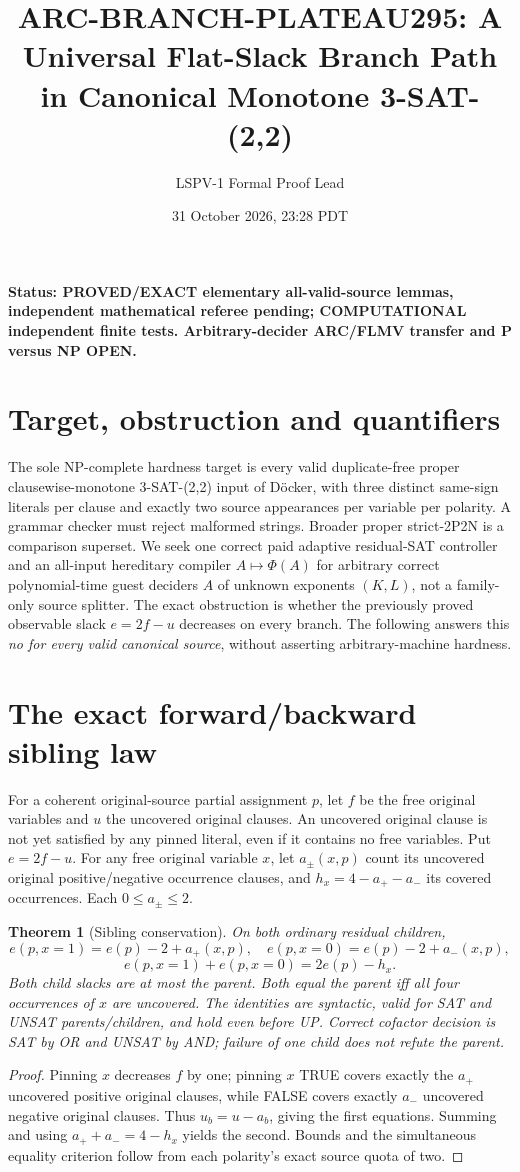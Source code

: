 \documentclass[11pt]{article}
\title{ARC-BRANCH-PLATEAU295: A Universal Flat-Slack Branch Path in Canonical Monotone 3-SAT-(2,2)}
\author{LSPV-1 Formal Proof Lead}
\date{31 October 2026, 23:28 PDT}
\newtheorem{theorem}{Theorem}
\begin{document}
\maketitle
\noindent\textbf{Status: PROVED/EXACT elementary all-valid-source lemmas, independent mathematical referee pending; COMPUTATIONAL independent finite tests. Arbitrary-decider ARC/FLMV transfer and P versus NP OPEN.}
\section{Target, obstruction and quantifiers}
The sole NP-complete hardness target is every valid duplicate-free proper clausewise-monotone 3-SAT-(2,2) input of D\"ocker, with three distinct same-sign literals per clause and exactly two source appearances per variable per polarity. A grammar checker must reject malformed strings. Broader proper strict-2P2N is a comparison superset. We seek one correct paid adaptive residual-SAT controller and an all-input hereditary compiler $A\mapsto\Phi(A)$ for arbitrary correct polynomial-time guest deciders $A$ of unknown exponents $(K,L)$, not a family-only source splitter. The exact obstruction is whether the previously proved observable slack $e=2f-u$ decreases on every branch. The following answers this \emph{no for every valid canonical source}, without asserting arbitrary-machine hardness.
\section{The exact forward/backward sibling law}
For a coherent original-source partial assignment $p$, let $f$ be the free original variables and $u$ the uncovered original clauses. An uncovered original clause is not yet satisfied by any pinned literal, even if it contains no free variables. Put $e=2f-u$. For any free original variable $x$, let $a_\pm(x,p)$ count its uncovered original positive/negative occurrence clauses, and $h_x=4-a_+-a_-$ its covered occurrences. Each $0\le a_\pm\le2$.
\begin{theorem}[Sibling conservation]\label{thm:sib}
On both ordinary residual children,
\[
\boxed{e(p,x=1)=e(p)-2+a_+(x,p),\quad
 e(p,x=0)=e(p)-2+a_-(x,p),}
\]
\[
\boxed{e(p,x=1)+e(p,x=0)=2e(p)-h_x.}
\]
Both child slacks are at most the parent. Both equal the parent iff all four occurrences of $x$ are uncovered. The identities are syntactic, valid for SAT and UNSAT parents/children, and hold even before UP. Correct cofactor decision is SAT by OR and UNSAT by AND; failure of one child does not refute the parent.
\end{theorem}
\begin{proof}
Pinning $x$ decreases $f$ by one; pinning $x$ TRUE covers exactly the $a_+$ uncovered positive original clauses, while FALSE covers exactly $a_-$ uncovered negative original clauses. Thus $u_b=u-a_b$, giving the first equations. Summing and using $a_++a_-=4-h_x$ yields the second. Bounds and the simultaneous equality criterion follow from each polarity's exact source quota of two.
\end{proof}
\end{document}

